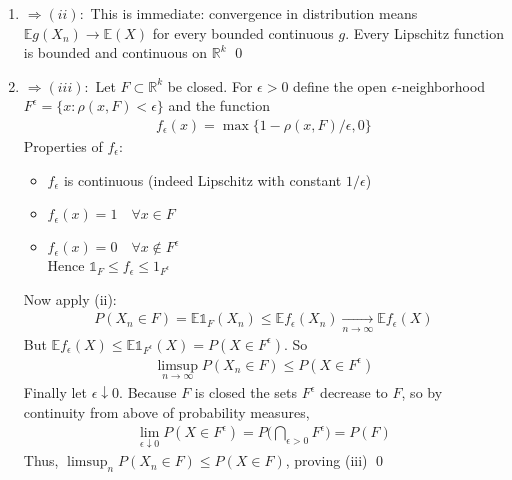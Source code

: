 \documentclass[10pt]{article}
\begin{document}
\begin{enumerate}[label=\textit{(\roman*)}]
    \item $\Longrightarrow (ii):$ This is immediate: convergence in distribution means $\mathbb{E}g(X_n) \to \mathbb{E}(X)$ for every bounded continuous $g$. Every Lipschitz function is bounded and continuous on $\mathbb{R}^k$ \qed
    \item $\Longrightarrow (iii):$ Let $F \subset \mathbb{R}^k$ be closed. For $\epsilon > 0$ define the open $\epsilon$-neighborhood $F^\epsilon = \{x : \rho(x, F) < \epsilon\}$ and the function 
    \begin{gather*}
        f_\epsilon(x) = \max \{1 - \rho(x, F) / \epsilon, 0\}
    \end{gather*}
    Properties of $f_\epsilon$:
    \begin{itemize}
        \item $f_\epsilon$ is continuous (indeed Lipschitz with constant $1 / \epsilon$)
        \item $f_\epsilon(x) = 1 \quad\forall x \in F$
        \item $f_\epsilon(x) = 0 \quad\forall x \notin F^\epsilon$\\
        Hence $\mathbb{1}_F \leq f_\epsilon \leq 1_{F^\epsilon}$
    \end{itemize}
    Now apply (ii): 
    \begin{gather*}
        P(X_n \in F) = \mathbb{E}\mathbb{1}_F(X_n) \leq \mathbb{E}f_\epsilon(X_n) \xrightarrow[n \to \infty]{} \mathbb{E}f_\epsilon(X)
    \end{gather*}
    But $\mathbb{E}f_\epsilon(X) \leq \mathbb{E}\mathbb{1}_{F^\epsilon}(X) = P(X \in F^\epsilon)$. So 
    \begin{gather*}
        \limsup_{n \to \infty}P(X_n \in F) \leq P(X \in F^\epsilon)
    \end{gather*}
    Finally let $\epsilon \downarrow 0$. Because $F$ is closed the sets $F^\epsilon$ decrease to $F$, so by continuity from above of probability measures,
    \begin{gather*}
        \lim_{\epsilon\downarrow0}P(X \in F^\epsilon) = P\Big(\bigcap_{\epsilon > 0}F^\epsilon\Big) = P(F)
    \end{gather*}
    Thus, $\limsup_n P(X_n \in F) \leq P(X \in F)$, proving (iii) \qed

    \newpage


\end{enumerate}
\end{document}

